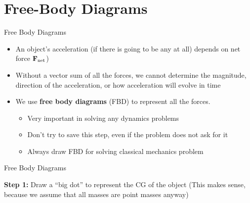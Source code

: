 \documentclass[12pt,compress,aspectratio=169]{beamer}
\newcommand{\mb}[1]{\ensuremath\mathbf{#1}}
\begin{document}
\section{Free-Body Diagrams}


\begin{frame}{Free Body Diagrams}
  \begin{itemize}
  \item An object's acceleration (if there is going to be any at all) depends
    on net force $\mb{F}_\mathrm{net}$)
  \item Without a vector sum of all the forces, we cannot determine the
    magnitude, direction of the acceleration, or how acceleration will evolve
    in time
  \item We use \textbf{free body diagrams} (FBD) to represent all the forces.
    \begin{itemize}
    \item Very important in solving any dynamics problems
    \item Don't try to save this step, even if the problem does not ask for it
    \item Always draw FBD for solving classical mechanics problem
    \end{itemize}
  \end{itemize}
\end{frame}



\begin{frame}{Free Body Diagrams}

  \textbf{Step 1:} Draw a ``big dot'' to represent the CG of the
  object (This makes sense, because we assume that all masses are point masses
  anyway)

  \begin{center}
  \end{center}

\end{frame}
\end{document}
